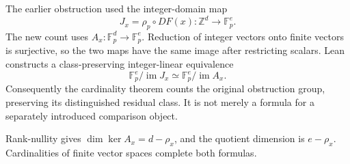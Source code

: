 The earlier obstruction used the integer-domain map \[
J_x=\rho_p\circ DF(x):\mathbb Z^d\to\mathbb F_p^e.
\] The new count uses \(A_x:\mathbb F_p^d\to\mathbb F_p^e\). Reduction
of integer vectors onto finite vectors is surjective, so the two maps
have the same image after restricting scalars. Lean constructs a
class-preserving integer-linear equivalence \[
\mathbb F_p^e/\operatorname{im}J_x
\simeq
\mathbb F_p^e/\operatorname{im}A_x.
\] Consequently the cardinality theorem counts the original obstruction
group, preserving its distinguished residual class. It is not merely a
formula for a separately introduced comparison object.

Rank-nullity gives \(\dim\ker A_x=d-\rho_x\), and the quotient dimension
is \(e-\rho_x\). Cardinalities of finite vector spaces complete both
formulas.
